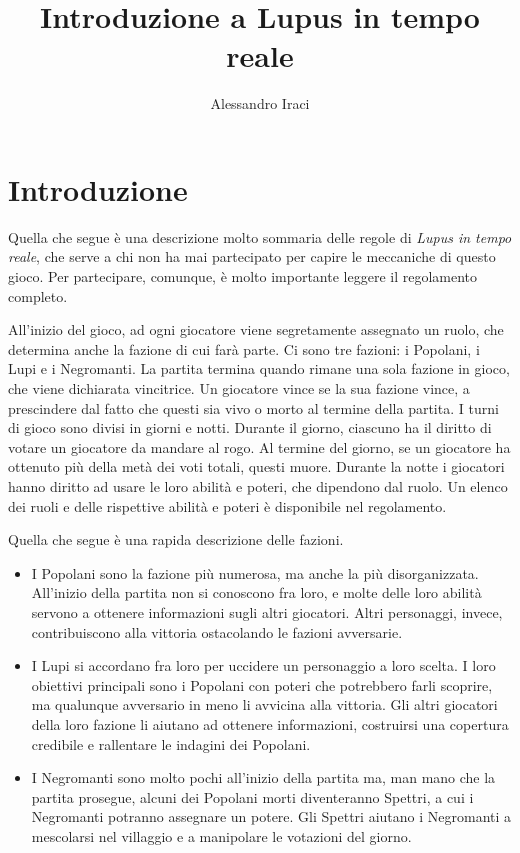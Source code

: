 \documentclass[a4paper,10pt]{article}
\title{Introduzione a Lupus in tempo reale}
\author{Alessandro Iraci}
\begin{document}
\maketitle

\section{Introduzione}

Quella che segue è una descrizione molto sommaria delle regole di \emph{Lupus in tempo reale}, che serve a chi non ha mai partecipato per capire le meccaniche di questo gioco. Per partecipare, comunque, è molto importante leggere il regolamento completo.

All'inizio del gioco, ad ogni giocatore viene segretamente assegnato un ruolo, che determina anche la fazione di cui farà parte. Ci sono tre fazioni: i Popolani, i Lupi e i Negromanti. La partita termina quando rimane una sola fazione in gioco, che viene dichiarata vincitrice. Un giocatore vince se la sua fazione vince, a prescindere dal fatto che questi sia vivo o morto al termine della partita.
I turni di gioco sono divisi in giorni e notti. Durante il giorno, ciascuno ha il diritto di votare un giocatore da mandare al rogo. Al termine del giorno, se un giocatore ha ottenuto più della metà dei voti totali, questi muore. Durante la notte i giocatori hanno diritto ad usare le loro abilità e poteri, che dipendono dal ruolo. Un elenco dei ruoli e delle rispettive abilità e poteri è disponibile nel regolamento.

Quella che segue è una rapida descrizione delle fazioni.

\begin{itemize}
	
	\item I Popolani sono la fazione più numerosa, ma anche la più disorganizzata. All'inizio della partita non si conoscono fra loro, e molte delle loro abilità servono a ottenere informazioni sugli altri giocatori. Altri personaggi, invece, contribuiscono alla vittoria ostacolando le fazioni avversarie.
	
 	\item I Lupi si accordano fra loro per uccidere un personaggio a loro scelta. I loro obiettivi principali sono i Popolani con poteri che potrebbero farli scoprire, ma qualunque avversario in meno li avvicina alla vittoria. Gli altri giocatori della loro fazione li aiutano ad ottenere informazioni, costruirsi una copertura credibile e rallentare le indagini dei Popolani.
 	
	\item I Negromanti sono molto pochi all'inizio della partita ma, man mano che la partita prosegue, alcuni dei Popolani morti diventeranno Spettri, a cui i Negromanti potranno assegnare un potere. Gli Spettri aiutano i Negromanti a mescolarsi nel villaggio e a manipolare le votazioni del giorno.
\end{itemize}
\end{document}
